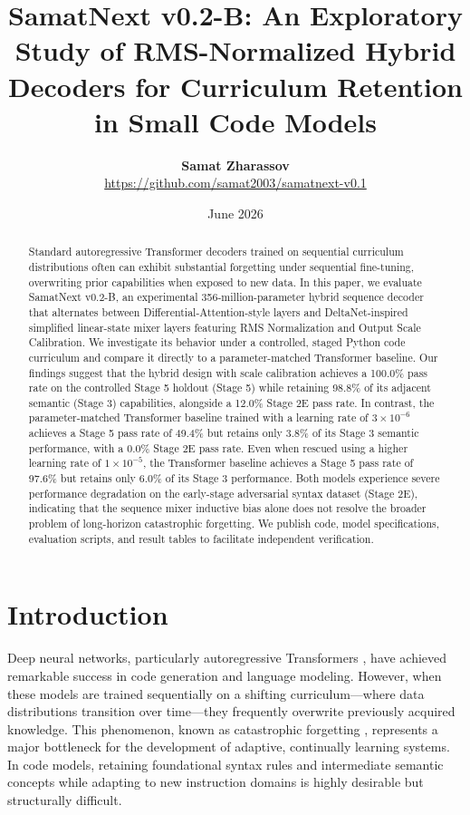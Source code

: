 \documentclass[11pt,a4paper]{article}
\title{\textbf{SamatNext v0.2-B: An Exploratory Study of RMS-Normalized Hybrid Decoders for Curriculum Retention in Small Code Models}}
\author{\textbf{Samat Zharassov} \\ \url{https://github.com/samat2003/samatnext-v0.1}}
\date{June 2026}
\begin{document}
\maketitle

\begin{abstract}
Standard autoregressive Transformer decoders trained on sequential curriculum distributions often can exhibit substantial forgetting under sequential fine-tuning, overwriting prior capabilities when exposed to new data. In this paper, we evaluate SamatNext v0.2-B, an experimental 356-million-parameter hybrid sequence decoder that alternates between Differential-Attention-style layers and DeltaNet-inspired simplified linear-state mixer layers featuring RMS Normalization and Output Scale Calibration. We investigate its behavior under a controlled, staged Python code curriculum and compare it directly to a parameter-matched Transformer baseline. Our findings suggest that the hybrid design with scale calibration achieves a 100.0\% pass rate on the controlled Stage 5 holdout (Stage 5) while retaining 98.8\% of its adjacent semantic (Stage 3) capabilities, alongside a 12.0\% Stage 2E pass rate. In contrast, the parameter-matched Transformer baseline trained with a learning rate of $3\times 10^{-6}$ achieves a Stage 5 pass rate of 49.4\% but retains only 3.8\% of its Stage 3 semantic performance, with a 0.0\% Stage 2E pass rate. Even when rescued using a higher learning rate of $1\times 10^{-5}$, the Transformer baseline achieves a Stage 5 pass rate of 97.6\% but retains only 6.0\% of its Stage 3 performance. Both models experience severe performance degradation on the early-stage adversarial syntax dataset (Stage 2E), indicating that the sequence mixer inductive bias alone does not resolve the broader problem of long-horizon catastrophic forgetting. We publish code, model specifications, evaluation scripts, and result tables to facilitate independent verification.
\end{abstract}

\section{Introduction}
Deep neural networks, particularly autoregressive Transformers \cite{vaswani2017attention},
have achieved remarkable success in code generation and language modeling. However, when these models are trained sequentially on a shifting curriculum---where data distributions transition over time---they frequently overwrite previously acquired knowledge. This phenomenon, known as catastrophic forgetting \cite{mccloskey1989catastrophic},
represents a major bottleneck for the development of adaptive, continually learning systems. In code models, retaining foundational syntax rules and intermediate semantic concepts while adapting to new instruction domains is highly desirable but structurally difficult.
\end{document}
